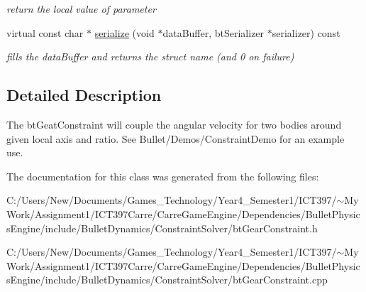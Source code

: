 \begin{CompactItemize}
\begin{CompactList}\small\item\em return the local value of parameter \item\end{CompactList}\item 
\hypertarget{classbt_gear_constraint_223dc7a58e6d97f6b9cd5bd73b1dd440}{
virtual const char $\ast$ \hyperlink{classbt_gear_constraint_223dc7a58e6d97f6b9cd5bd73b1dd440}{serialize} (void $\ast$dataBuffer, btSerializer $\ast$serializer) const }
\label{classbt_gear_constraint_223dc7a58e6d97f6b9cd5bd73b1dd440}

\begin{CompactList}\small\item\em fills the dataBuffer and returns the struct name (and 0 on failure) \item\end{CompactList}\end{CompactItemize}


\subsection{Detailed Description}
The btGeatConstraint will couple the angular velocity for two bodies around given local axis and ratio. See Bullet/Demos/ConstraintDemo for an example use. 

The documentation for this class was generated from the following files:\begin{CompactItemize}
\item 
C:/Users/New/Documents/Games\_\-Technology/Year4\_\-Semester1/ICT397/$\sim$My Work/Assignment1/ICT397Carre/CarreGameEngine/Dependencies/BulletPhysicsEngine/include/BulletDynamics/ConstraintSolver/btGearConstraint.h\item 
C:/Users/New/Documents/Games\_\-Technology/Year4\_\-Semester1/ICT397/$\sim$My Work/Assignment1/ICT397Carre/CarreGameEngine/Dependencies/BulletPhysicsEngine/include/BulletDynamics/ConstraintSolver/btGearConstraint.cpp\end{CompactItemize}

